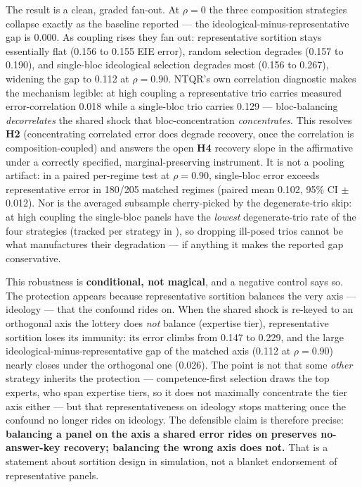 \documentclass[
]{article}
\begin{document}
The result is a clean, graded fan-out. At \(\rho=0\) the three
composition strategies collapse exactly as the baseline reported --- the
ideological-minus-representative gap is 0.000. As coupling rises they
fan out: representative sortition stays essentially flat (0.156 to 0.155
EIE error), random selection degrades (0.157 to 0.190), and single-bloc
ideological selection degrades most (0.156 to 0.267), widening the gap
to 0.112 at \(\rho=0.90\). NTQR's own correlation diagnostic makes the
mechanism legible: at high coupling a representative trio carries
measured error-correlation 0.018 while a single-bloc trio carries 0.129
--- bloc-balancing \emph{decorrelates} the shared shock that
bloc-concentration \emph{concentrates}. This resolves \textbf{H2}
(concentrating correlated error does degrade recovery, once the
correlation is composition-coupled) and answers the open \textbf{H4}
recovery slope in the affirmative under a correctly specified,
marginal-preserving instrument. It is not a pooling artifact: in a
paired per-regime test at \(\rho=0.90\), single-bloc error exceeds
representative error in 180/205 matched regimes (paired mean 0.102, 95\%
CI \texorpdfstring{\ensuremath{\pm}}{+/-}0.012). Nor is the averaged subsample cherry-picked by the
degenerate-trio skip: at high coupling the single-bloc panels have the
\emph{lowest} degenerate-trio rate of the four strategies (tracked per
strategy in ), so dropping ill-posed
trios cannot be what manufactures their degradation --- if anything it
makes the reported gap conservative.

This robustness is \textbf{conditional, not magical}, and a negative
control says so. The protection appears because representative sortition
balances the very axis --- ideology --- that the confound rides on. When
the shared shock is re-keyed to an orthogonal axis the lottery does
\emph{not} balance (expertise tier), representative sortition loses its
immunity: its error climbs from 0.147 to 0.229, and the large
ideological-minus-representative gap of the matched axis (0.112 at
\(\rho=0.90\)) nearly closes under the orthogonal one (0.026). The point
is not that some \emph{other} strategy inherits the protection ---
competence-first selection draws the top experts, who span expertise
tiers, so it does not maximally concentrate the tier axis either --- but
that representativeness on ideology stops mattering once the confound no
longer rides on ideology. The defensible claim is therefore precise:
\textbf{balancing a panel on the axis a shared error rides on preserves
no-answer-key recovery; balancing the wrong axis does not.} That is a
statement about sortition design in simulation, not a blanket
endorsement of representative panels.
\end{document}
